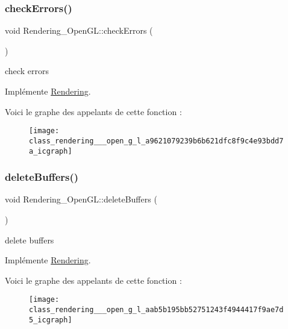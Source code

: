 \subsubsection{\texorpdfstring{check\+Errors()}{checkErrors()}}
{\footnotesize\ttfamily void Rendering\+\_\+\+Open\+G\+L\+::check\+Errors (\begin{DoxyParamCaption}{ }\end{DoxyParamCaption})\hspace{0.3cm}{\ttfamily [virtual]}}



check errors 



Implémente \hyperlink{class_rendering_a93693702cf5a7709a7b1ddc7a7d3d8d3}{Rendering}.

Voici le graphe des appelants de cette fonction \+:\nopagebreak
\begin{figure}[H]
\begin{center}
\leavevmode
\texttt{[image: class\_rendering\_\_\_open\_g\_l\_a9621079239b6b621dfc8f9c4e93bdd7a\_icgraph]}
\end{center}
\end{figure}
\mbox{\label{class_rendering___open_g_l_aab5b195bb52751243f4944417f9ae7d5}} 
\subsubsection{\texorpdfstring{delete\+Buffers()}{deleteBuffers()}}
{\footnotesize\ttfamily void Rendering\+\_\+\+Open\+G\+L\+::delete\+Buffers (\begin{DoxyParamCaption}{ }\end{DoxyParamCaption})\hspace{0.3cm}{\ttfamily [virtual]}}



delete buffers 



Implémente \hyperlink{class_rendering_a43cc4c8b7b4d9813773b42c97a7405d5}{Rendering}.

Voici le graphe des appelants de cette fonction \+:\nopagebreak
\begin{figure}[H]
\begin{center}
\leavevmode
\texttt{[image: class\_rendering\_\_\_open\_g\_l\_aab5b195bb52751243f4944417f9ae7d5\_icgraph]}
\end{center}
\end{figure}
\mbox{\label{class_rendering___open_g_l_a94abb636d4264637628e4b9b97c087d2}} 
